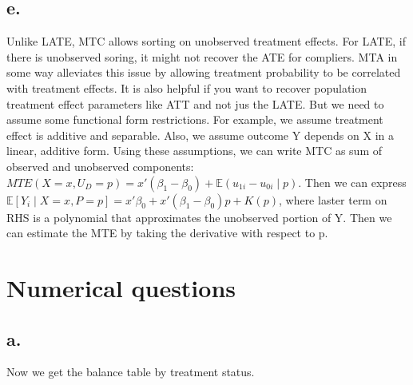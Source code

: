 \documentclass[
  letterpaper,
  DIV=11,
  numbers=noendperiod]{scrartcl}
\begin{document}
\subsection{e.}\label{e.}

Unlike LATE, MTC allows sorting on unobserved treatment effects. For
LATE, if there is unobserved soring, it might not recover the ATE for
compliers. MTA in some way alleviates this issue by allowing treatment
probability to be correlated with treatment effects. It is also helpful
if you want to recover population treatment effect parameters like ATT
and not jus the LATE. But we need to assume some functional form
restrictions. For example, we assume treatment effect is additive and
separable. Also, we assume outcome Y depends on X in a linear, additive
form. Using these assumptions, we can write MTC as sum of observed and
unobserved components:
\(MTE(X=x, U_D = p) = x'(\beta_1 - \beta_0) + \mathbb{E}(u_{1i} - u_{0i} \mid p)\).
Then we can express
\(\mathbb{E}[Y_i \mid X = x, P = p] = x' \beta_0 + x' (\beta_1 - \beta_0)p + K(p)\),
where laster term on RHS is a polynomial that approximates the
unobserved portion of Y. Then we can estimate the MTE by taking the
derivative with respect to p.

\section{Numerical questions}\label{numerical-questions}

\subsection{a.}\label{a.-1}

Now we get the balance table by treatment status.

\begin{table}[!h]
\centering
{}
\end{table}
\end{document}
